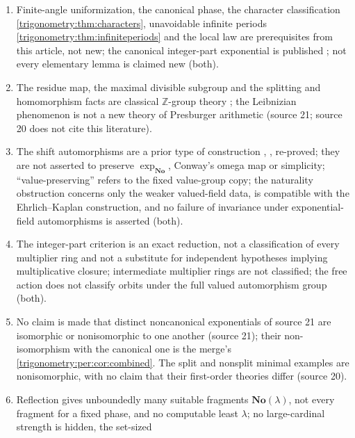 \documentclass[11pt,letterpaper]{article}
\numberwithin{equation}{section}
\theoremstyle{definition}
\theoremstyle{remark}
\newcommand{\No}{\mathbf{No}}
\newcommand{\Z}{\mathbb Z}
\begin{document}
\begin{enumerate}
\begin{enumerate}[label=(\alph*),itemsep=0.2em]
  would suffice, does not assert that Ehrlich and Kaplan conjectured initiality to be sufficient, and
  does not answer their second question on exponentials from different initial embeddings (both). The
  first-order separation is proved in the broader class of all exponentials with the strip and modulus
  properties (source 20).
 \item Finite-angle uniformization, the canonical phase, the character classification
  \cref{trigonometry:thm:characters}, unavoidable infinite periods \cref{trigonometry:thm:infiniteperiods}
  and the local law are prerequisites from this article, not new; the canonical integer-part
  exponential is published \cite[Proposition 11.2, Theorem 11.1]{EK}; not every elementary lemma is
  claimed new (both).
 \item The residue map, the maximal divisible subgroup and the splitting and homomorphism facts are
  classical $\Z$-group theory \cite{Jerabek}; the Leibnizian phenomenon is not a new theory of
  Presburger arithmetic (source 21; source 20 does not cite this literature).
 \item The shift automorphisms are a prior type of construction \cite[Theorem 5.2]{Saut},
  \cite[\S4]{KKS}, re-proved; they are not asserted to preserve $\exp_{\No}$, Conway's omega map or
  simplicity; ``value-preserving'' refers to the fixed value-group copy; the naturality obstruction
  concerns only the weaker valued-field data, is compatible with the Ehrlich--Kaplan construction, and
  no failure of invariance under exponential-field automorphisms is asserted (both).
 \item The integer-part criterion is an exact reduction, not a classification of every multiplier ring
  and not a substitute for independent hypotheses implying multiplicative closure; intermediate
  multiplier rings are not classified; the free action does not classify orbits under the full valued
  automorphism group (both).
 \item No claim is made that distinct noncanonical exponentials of source 21 are isomorphic or
  nonisomorphic to one another (source 21); their non-isomorphism with the canonical one is the merge's
  \cref{trigonometry:per:cor:combined}. The split and nonsplit minimal examples are nonisomorphic, with
  no claim that their first-order theories differ (source 20).
 \item Reflection gives unboundedly many suitable fragments $\No(\lambda)$, not every fragment for a
  fixed phase, and no computable least $\lambda$; no large-cardinal strength is hidden, the set-sized

\end{enumerate}
\end{enumerate}
\end{document}
